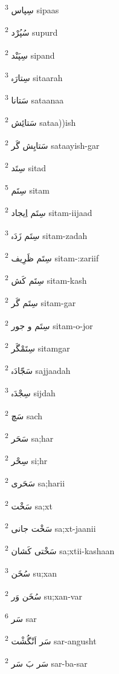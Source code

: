 \documentclass[12pt]{article}
\begin{document}
\begin{multicols}{5}
{\ur سِپاس}   \textsuperscript{3} sipaas

{\ur سُپُرْد}   \textsuperscript{2} supurd

{\ur سِپَنْد}   \textsuperscript{2} sipand

{\ur سِتارَہ}   \textsuperscript{3} sitaarah

{\ur سَتانا}   \textsuperscript{3} sataanaa

{\ur سَتائِش}   \textsuperscript{2} sataa))ish

{\ur سَتایِش گَر}   \textsuperscript{2} sataayish-gar

{\ur سِتَد}   \textsuperscript{2} sitad

{\ur سِتَم}   \textsuperscript{5} sitam

{\ur سِتَم اِیجاد}   \textsuperscript{2} sitam-iijaad

{\ur سِتَم زَدَہ}   \textsuperscript{3} sitam-zadah

{\ur سِتَم ظَرِیف}   \textsuperscript{2} sitam-:zariif

{\ur سِتَم کَش}   \textsuperscript{2} sitam-kash

{\ur سِتَم گَر}   \textsuperscript{2} sitam-gar

{\ur سِتَم و جور}   \textsuperscript{2} sitam-o-jor

{\ur سِتَمْگَر}   \textsuperscript{2} sitamgar

{\ur سَجّادَہ}   \textsuperscript{2} sajjaadah

{\ur سِجْدَہ}   \textsuperscript{3} sijdah

{\ur سَچ}   \textsuperscript{2} sach

{\ur سَحَر}   \textsuperscript{2} sa;har

{\ur سِحْر}   \textsuperscript{2} si;hr

{\ur سَحَری}   \textsuperscript{2} sa;harii

{\ur سَخْت}   \textsuperscript{2} sa;xt

{\ur سَخْت جانی}   \textsuperscript{2} sa;xt-jaanii

{\ur سَخْتی کَشان}   \textsuperscript{2} sa;xtii-kashaan

{\ur سُخَن}   \textsuperscript{3} su;xan

{\ur سُخَن وَر}   \textsuperscript{2} su;xan-var

{\ur سَر}   \textsuperscript{6} sar

{\ur سَر اَنْگُشْت}   \textsuperscript{2} sar-angusht

{\ur سَر بَ سَر}   \textsuperscript{2} sar-ba-sar


\end{multicols}
\end{document}
